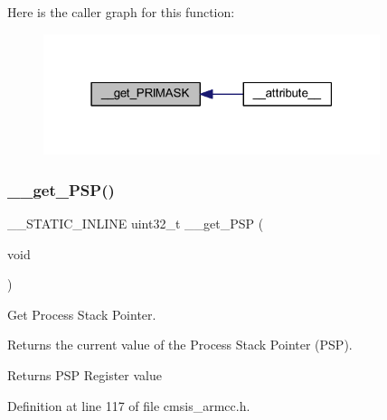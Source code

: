Here is the caller graph for this function\+:
\nopagebreak
\begin{figure}[H]
\begin{center}
\leavevmode
\includegraphics[width=279pt]{group___c_m_s_i_s___core___reg_acc_functions_gac9e3a67ff722261b89c77ebe49b6f9a7_icgraph}
\end{center}
\end{figure}
\mbox{\label{group___c_m_s_i_s___core___reg_acc_functions_ga0c569cbb49336f8d638686f9103047aa}} 
\subsubsection{\texorpdfstring{\+\_\+\+\_\+get\+\_\+\+P\+S\+P()}{\_\_get\_PSP()}}
{\footnotesize\ttfamily \+\_\+\+\_\+\+S\+T\+A\+T\+I\+C\+\_\+\+I\+N\+L\+I\+NE uint32\+\_\+t \+\_\+\+\_\+get\+\_\+\+P\+SP (\begin{DoxyParamCaption}\item[{void}]{ }\end{DoxyParamCaption})}



Get Process Stack Pointer. 

Returns the current value of the Process Stack Pointer (P\+SP). \begin{DoxyReturn}{Returns}
P\+SP Register value 
\end{DoxyReturn}


Definition at line 117 of file cmsis\+\_\+armcc.\+h.

